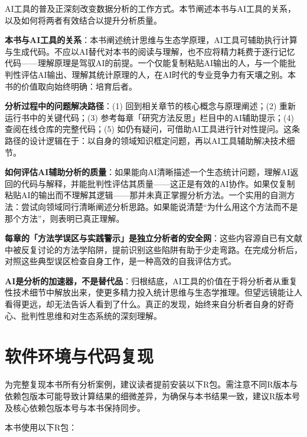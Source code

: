 \documentclass[
  twoside,12pt,fontset=none]{ctexbook}
\begin{document}
AI工具的普及正深刻改变数据分析的工作方式。本节阐述本书与AI工具的关系，以及如何将两者有效结合以提升分析质量。

\textbf{本书与AI工具的关系}：本书阐述统计思维与生态学原理，AI工具可辅助执行计算与生成代码。不应以AI替代对本书的阅读与理解，也不应将精力耗费于逐行记忆代码------理解原理是驾驭AI的前提。一个仅能复制粘贴AI输出的人，与一个能批判性评估AI输出、理解其统计原理的人，在AI时代的专业竞争力有天壤之别。本书的价值取向始终明确：培育后者。

\textbf{分析过程中的问题解决路径}：(1) 回到相关章节的核心概念与原理阐述；(2) 重新运行书中的关键代码；(3) 参考每章「研究方法反思」栏目中的AI辅助提示；(4) 查阅在线仓库的完整代码；(5) 如仍有疑问，可借助AI工具进行针对性提问。这条路径的设计逻辑在于：以自身的领域知识框定问题，再以AI工具辅助解决技术细节。

\textbf{如何评估AI辅助分析的质量}：如果能向AI清晰描述一个生态统计问题，理解AI返回的代码与解释，并能批判性评估其质量------这正是有效的AI协作。如果仅复制粘贴AI的输出而不理解其逻辑------那并未真正掌握分析方法。一个实用的自测方法：尝试向领域同行清晰阐述分析思路。如果能说清楚``为什么用这个方法而不是那个方法''，则表明已真正理解。

\textbf{每章的「方法学误区与实践警示」是独立分析者的安全网}：这些内容源自已有文献中被反复讨论的方法学陷阱，提前识别这些陷阱有助于少走弯路。在完成分析后，对照这些典型误区检查自身工作，是一种高效的自我评估方式。

\textbf{AI是分析的加速器，不是替代品}：归根结底，AI工具的价值在于将分析者从重复性技术细节中解放出来，使更多精力投入统计思维与生态学推理。但望远镜能让人看得更远，却无法告诉人看到了什么。真正的发现，始终来自分析者自身的好奇心、批判性思维和对生态系统的深刻理解。

\hypertarget{ux8f6fux4ef6ux73afux5883ux4e0eux4ee3ux7801ux590dux73b0}{%
\section{软件环境与代码复现}\label{ux8f6fux4ef6ux73afux5883ux4e0eux4ee3ux7801ux590dux73b0}}

为完整复现本书所有分析案例，建议读者提前安装以下R包。需注意不同R版本与依赖包版本可能导致计算结果的细微差异，为确保与本书结果一致，建议R版本号及核心依赖包版本号与本书保持同步。

本书使用以下R包：
\end{document}
